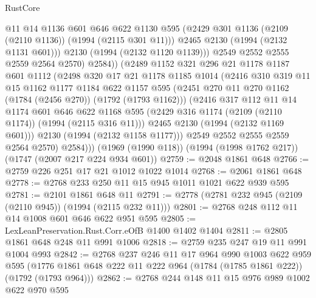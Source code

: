 \begin{lexlean}{RustCore}
\begin{coremodule}
                  @11
                  @14
                  @1136
                  @601
                  @646
                  @622
                  @1130
                  @595
                  (@2429 @301 @1136 (@2109 (@2110 @1136)) (@1994 (@2115 @301 @11)))
                  @2465
                  @2130
                  (@1994 (@2132 @1131 @601)))
                @2130
                (@1994 (@2132 @1120 @1139)))
              @2549
              @2552
              @2555
              @2559
              @2564
              @2570)
            @2584))
        (@2489
          @1152
          @321
          @296
          @21
          @1178
          @1187
          @601
          @1112
          (@2498
            @320
            @17
            @21
            @1178
            @1185
            @1014
            (@2416
              @310
              @319
              @11
              @15
              @1162
              @1177
              @1184
              @622
              @1157
              @595
              (@2451 @270 @11 @270 @1162 (@1784 (@2456 @270)) (@1792 (@1793 @1162)))
              (@2416
                @317
                @112
                @11
                @14
                @1174
                @601
                @646
                @622
                @1168
                @595
                (@2429 @316 @1174 (@2109 (@2110 @1174)) (@1994 (@2115 @316 @11)))
                @2465
                @2130
                (@1994 (@2132 @1169 @601)))
              @2130
              (@1994 (@2132 @1158 @1177)))
            @2549
            @2552
            @2555
            @2559
            @2564
            @2570)
          @2584)))
    (@1969 (@1990 @118))
    (@1994 (@1998 @1762 @217))
    (@1747 (@2007 @217 @224 @934 @601))
@2759 := @2048 @1861 @648
@2766 := @2759 @226 @251 @17 @21 @1012 @1022 @1014
@2768 := @2061 @1861 @648
@2778 := @2768 @233 @250 @11 @15 @945 @1011 @1021 @622 @939 @595
@2781 := @2101 @1861 @648 @11
@2791 := @2778 (@2781 @232 @945 (@2109 (@2110 @945)) (@1994 (@2115 @232 @11)))
@2801 := @2768 @248 @112 @11 @14 @1008 @601 @646 @622 @951 @595
@2805 := LexLeanPreservation.Rust.Corr.eOfB @1400 @1402 @1404
@2811 := @2805 @1861 @648 @248 @11 @991 @1006
@2818 := @2759 @235 @247 @19 @11 @991 @1004 @993
@2842 := @2768
    @237
    @246
    @11
    @17
    @964
    @990
    @1003
    @622
    @959
    @595
    (@1776 @1861 @648 @222 @11 @222 @964 (@1784 (@1785 @1861 @222)) (@1792 (@1793 @964)))
@2862 := @2768
    @244
    @148
    @11
    @15
    @976
    @989
    @1002
    @622
    @970
    @595

\end{coremodule}
\end{lexlean}
